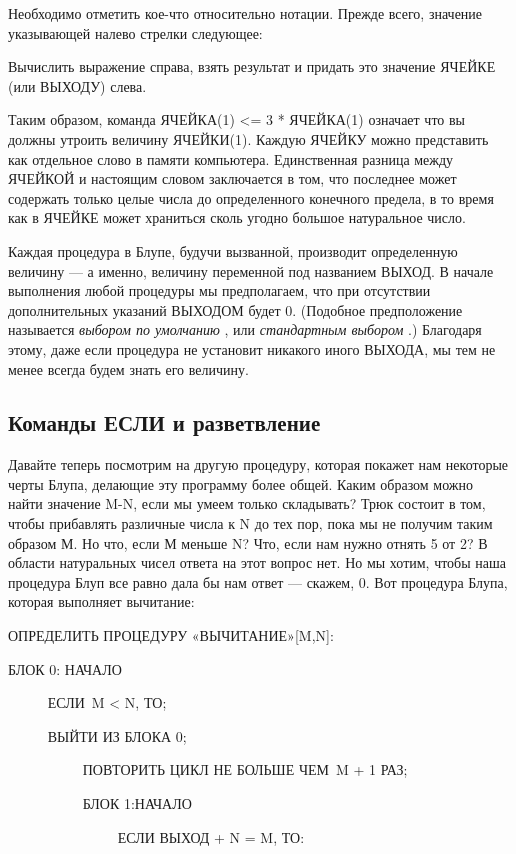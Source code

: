 \documentclass[../main.tex]{subfiles}
\begin{document}
Необходимо отметить кое-что относительно нотации. Прежде всего, значение указывающей налево стрелки следующее:

Вычислить выражение справа, взять результат и придать это значение ЯЧЕЙКЕ (или ВЫХОДУ) слева.

Таким образом, команда ЯЧЕЙКА(1) \textless= 3 * ЯЧЕЙКА(1) означает что вы должны утроить величину ЯЧЕЙКИ(1). Каждую ЯЧЕЙКУ можно представить как отдельное слово в памяти компьютера. Единственная разница между ЯЧЕЙКОЙ и настоящим словом заключается в том, что последнее может содержать только целые числа до определенного конечного предела, в то время как в ЯЧЕЙКЕ может храниться сколь угодно большое натуральное число.

Каждая процедура в Блупе, будучи вызванной, производит определенную величину --- а именно, величину переменной под названием ВЫХОД. В начале выполнения любой процедуры мы предполагаем, что при отсутствии дополнительных указаний ВЫХОДОМ будет 0. (Подобное предположение называется \emph{выбором по умолчанию} , или \emph{стандартным выбором} .) Благодаря этому, даже если процедура не установит никакого иного ВЫХОДА, мы тем не менее всегда будем знать его величину.


\subsection{Команды ЕСЛИ и разветвление}

Давайте теперь посмотрим на другую процедуру, которая покажет нам некоторые черты Блупа, делающие эту программу более общей. Каким образом можно найти значение M-N, если мы умеем только складывать? Трюк состоит в том, чтобы прибавлять различные числа к N до тех пор, пока мы не получим таким образом М. Но что, если М меньше N? Что, если нам нужно отнять 5 от 2? В области натуральных чисел ответа на этот вопрос нет. Но мы хотим, чтобы наша процедура Блуп все равно дала бы нам ответ --- скажем, 0. Вот процедура Блупа, которая выполняет вычитание:

ОПРЕДЕЛИТЬ ПРОЦЕДУРУ «ВЫЧИТАНИЕ»{[}M,N{]}:

БЛОК 0: НАЧАЛО

~~~~~ ЕСЛИ~M \textless{} N, ТО;

~~~~~ ВЫЙТИ ИЗ БЛОКА 0;

~~~~~~~~~~ ПОВТОРИТЬ ЦИКЛ НЕ БОЛЬШЕ ЧЕМ~M + 1 РАЗ;

~~~~~~~~~~ БЛОК 1:НАЧАЛО

~~~~~~~~~~~~~~~ ЕСЛИ ВЫХОД + N = M, ТО:
\end{document}
